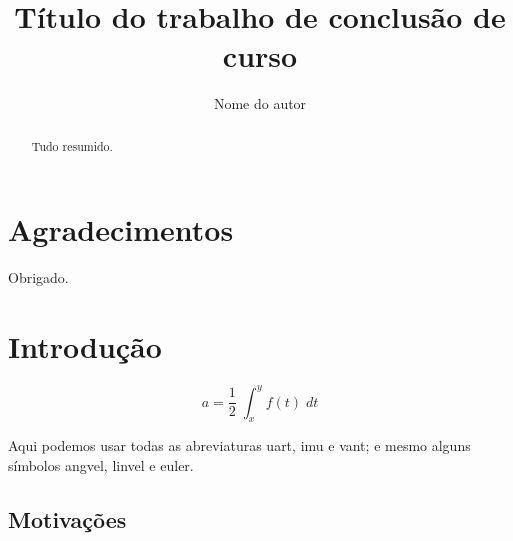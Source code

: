 \documentclass{automatex}
\title{Título do trabalho de conclusão de curso}
\author{Nome do autor}
\begin{document}
\maketitle

\setcounter{page}{1}

\tableofcontents

\section*{Agradecimentos}
Obrigado.
\newpage

\begin{abstract}
  Tudo resumido.
\end{abstract}
\newpage

\listoffigures
\newpage
{}
\listoftables
\newpage

\printglossary[type=\acronymtype,title=Lista de Abreviaturas e Siglas]
\newpage
{}
\printglossary[title=Lista de Simbolos]

\section{Introdução}

\setcounter{page}{1}

\lipsum[1-2]
\begin{equation}
  a = \dfrac{1}{2}\;\int_x^y f(t)\; dt
\end{equation}

Aqui podemos usar todas as abreviaturas \gls{uart}, \gls{imu} e \gls{vant}; e mesmo
alguns símbolos \gls{angvel}, \gls{linvel} e \gls{euler}.

\lipsum[24-26]

\subsection{Motivações}
\end{document}
